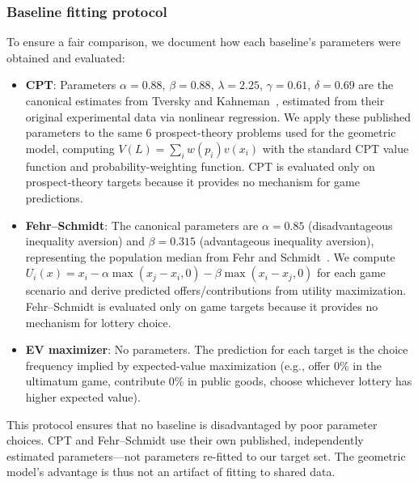 \documentclass[journal]{IEEEtran}
\begin{document}
\subsubsection{Baseline fitting protocol}
To ensure a fair comparison, we document how each baseline's parameters were obtained and evaluated:
\begin{itemize}
    \item \textbf{CPT}: Parameters $\alpha=0.88$, $\beta=0.88$, $\lambda=2.25$, $\gamma=0.61$, $\delta=0.69$ are the canonical estimates from Tversky and Kahneman~\cite{tversky1992}, estimated from their original experimental data via nonlinear regression.
    We apply these published parameters to the same 6 prospect-theory problems used for the geometric model, computing $V(L) = \sum_i w(p_i) v(x_i)$ with the standard CPT value function and probability-weighting function.
    CPT is evaluated only on prospect-theory targets because it provides no mechanism for game predictions.
    \item \textbf{Fehr--Schmidt}: The canonical parameters are $\alpha=0.85$ (disadvantageous inequality aversion) and $\beta=0.315$ (advantageous inequality aversion), representing the population median from Fehr and Schmidt~\cite{fehr1999}.
    We compute $U_i(x) = x_i - \alpha\max(x_j-x_i,0) - \beta\max(x_i-x_j,0)$ for each game scenario and derive predicted offers/contributions from utility maximization.
    Fehr--Schmidt is evaluated only on game targets because it provides no mechanism for lottery choice.
    \item \textbf{EV maximizer}: No parameters.
    The prediction for each target is the choice frequency implied by expected-value maximization (e.g., offer 0\% in the ultimatum game, contribute 0\% in public goods, choose whichever lottery has higher expected value).
\end{itemize}

This protocol ensures that no baseline is disadvantaged by poor parameter choices.
CPT and Fehr--Schmidt use their own published, independently estimated parameters---not parameters re-fitted to our target set.
The geometric model's advantage is thus not an artifact of fitting to shared data.
\end{document}
